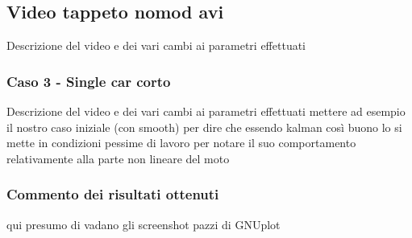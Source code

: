 \newpage
\subsection{Video tappeto nomod avi}
Descrizione del video e dei vari cambi ai parametri effettuati

\subsubsection{Caso 3 - Single car corto}
Descrizione del video e dei vari cambi ai parametri effettuati mettere ad esempio il nostro caso iniziale (con smooth) per dire che essendo kalman così buono lo si mette in condizioni pessime di lavoro per notare il suo comportamento relativamente alla parte non lineare del moto

\subsubsection{Commento dei risultati ottenuti}
qui presumo di vadano gli screenshot pazzi di GNUplot

